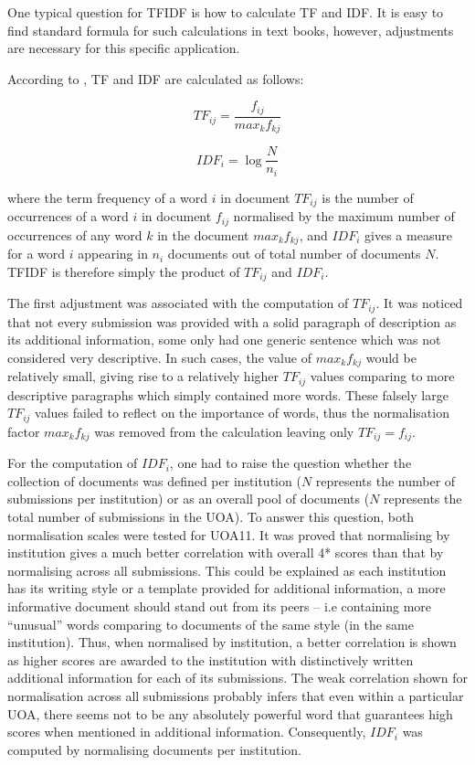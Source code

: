 \documentclass[a4paper, 11pt]{article}
\begin{document}
One typical question for TFIDF is how to calculate TF and IDF. It is easy to find standard formula for such calculations in text books, however, adjustments are necessary for this specific application. 

According to \citet*{DataMining}, TF and IDF are calculated as follows:

\begin{equation}
TF_{ij} = \frac{f_{ij}}{max_{k} f_{kj}}
\end{equation}

\begin{equation}
IDF_{i} = \log \frac{N}{n_i}
\end{equation}

where the term frequency of a word $i$ in document $TF_{ij}$ is the number of occurrences of a word $i$ in document $f_{ij}$ normalised by the maximum number of occurrences of any word $k$ in the document $ max_{k} f_{kj}$, and  $IDF_i$ gives a measure for a word $i$ appearing in $n_i$ documents out of total number of documents $N$. TFIDF is therefore simply the product of $TF_{ij}$ and $IDF_i$. 

The first adjustment was associated with the computation of $TF_{ij}$. It was noticed that not every submission was provided with a solid paragraph of description as its additional information, some only had one generic sentence which was not considered very descriptive. In such cases, the value of $max_{k}⁡ f_{kj}$ would be relatively small, giving rise to a relatively higher $TF_{ij}$ values comparing to more descriptive paragraphs which simply contained more words. These falsely large $TF_{ij}$ values failed to reflect on the importance of words, thus the normalisation factor $max_{k}⁡ f_{kj}$ was removed from the calculation leaving only $TF_{ij} = f_{ij}$.

For the computation of  $IDF_i$, one had to raise the question whether the collection of documents was defined per institution ($N$ represents the number of submissions per institution) or as an overall pool of documents ($N$ represents the total number of submissions in the UOA). To answer this question, both normalisation scales were tested for UOA11. It was proved that normalising by institution gives a much better correlation with overall 4* scores than that by normalising across all submissions. This could be explained as each institution has its writing style or a template provided for additional information, a more informative document should stand out from its peers -- i.e containing more ``unusual'' words comparing to documents of the same style (in the same institution). Thus, when normalised by institution, a better correlation is shown as higher scores are awarded to the institution with distinctively written additional information for each of its submissions. The weak correlation shown for normalisation across all submissions probably infers that even within a particular UOA, there seems not to be any absolutely powerful word that guarantees high scores when mentioned in additional information. Consequently, $IDF_i$ was computed by normalising documents per institution. 
\end{document}
